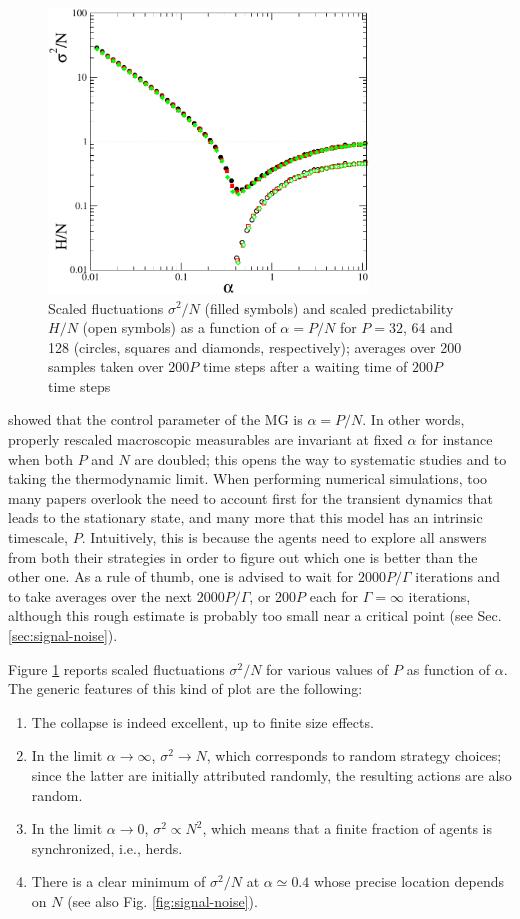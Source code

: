 \documentclass[aps,twocolumn,nofootinbib,sortedaddress,reprint]{revtex4-1}
\begin{document}
\begin{figure}
\includegraphics*[width=8.5cm]{fig1.pdf}
\caption{Scaled fluctuations $\sigma^2/N$ (filled symbols) and scaled
  predictability $H/N$ (open symbols) as a function of $\alpha=P/N$ for  $P=32$, 64 and 128 (circles, squares and diamonds,
  respectively); averages over 200 samples taken over $200P$ time steps after a waiting time of $200P$ time steps}
\label{fig:s2HRS}
\end{figure}
\textcite{Savit} showed that the control
parameter of the MG is $\alpha=P/N$. In other words, properly rescaled
macroscopic measurables are invariant at fixed $\alpha$ for instance
when both $P$ and $N$ are doubled; this opens the way to systematic
studies and to taking the thermodynamic limit. When performing
numerical simulations, too many papers overlook the need to account
first for the transient dynamics that leads to the stationary state,
and many more that this model has an intrinsic timescale,
$P$. Intuitively, this is because the agents need to explore all
answers from both their strategies in order to figure out which one is
better than the other one. As a rule of thumb, one is advised to wait
for $2000P/\Gamma$ iterations and to take averages over the next $2000P/\Gamma$, or $200P$ each for $\Gamma=\infty$
iterations, although this rough estimate is probably too small near a critical point
(see Sec. \ref{sec:signal-noise}).

Figure \ref{fig:s2HRS} reports scaled fluctuations $\sigma^2/N$ for
various values of $P$ as function of $\alpha$. The generic features of
this kind of plot are the following:
\begin{enumerate}
\item The collapse is indeed excellent, up to finite size effects.
\item In the limit $\alpha\to\infty$, $\sigma^2\to N$, which
  corresponds to random strategy choices; since the latter are
  initially attributed randomly, the resulting actions are also random.
\item In the limit $\alpha\to0$, $\sigma^2\propto N^2$, which means
  that a finite fraction of agents is synchronized, i.e., herds.
\item There is a clear minimum of $\sigma^2/N$ at $\alpha\simeq0.4$
  whose precise location depends on $N$ (see also
  Fig. \ref{fig:signal-noise}).
\end{enumerate}
\end{document}
